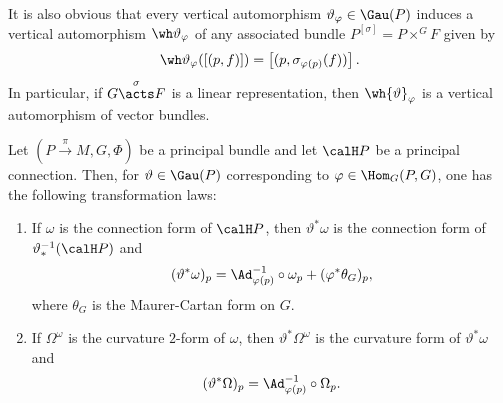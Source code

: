 It is also obvious that every vertical automorphism $\vartheta_\varphi\in\Gau(P)$ induces a vertical automorphism $\wh\vartheta_\varphi$ of any associated bundle $P^{[\sigma]}=P\times^G F$ given by
\[\wh\vartheta_\varphi([(p,f)])=\left[(p,\sigma_{\varphi(p)}(f))\right].\]
In particular, if $G\overset{\sigma}{\acts}F$ is a linear representation, then $\wh{\vartheta}_\varphi$ is a vertical automorphism of vector bundles.


\begin{prop}[{{\cite[Prop.~1.8.7]{RS2}}}]
    Let $(P\overset{\pi}{\to}M,G,\Phi)$ be a principal bundle and let $\calH P$ be a principal connection. Then, for $\vartheta\in \Gau(P)$ corresponding to $\varphi\in \Hom_G(P,G)$, one has the following transformation laws:
    \begin{enumerate}
        \item If $\omega$ is the connection form of $\calH P$, then $\vartheta^\ast \omega$ is the connection form of $\vartheta_\ast^{-1}(\calH P)$ and 
        \[(\vartheta^\ast\omega)_p=\Ad_{\varphi(p)}^{-1}\circ\omega_p+(\varphi^\ast\theta_G)_p,\label{eq 1.8.7 RS2}\]
        where $\theta_G$ is the Maurer-Cartan form on $G$.

        \item If $\Omega^\omega$ is the curvature $2$-form of $\omega$, then $\vartheta^\ast\Omega^\omega$ is the curvature form of $\vartheta^\ast\omega$ and
        \[(\vartheta^\ast\Omega)_p=\Ad_{\varphi(p)}^{-1}\circ\Omega_p.\label{eq 1.8.8 RS2}\]
    \end{enumerate}
\end{prop}
